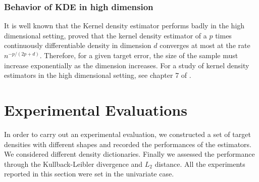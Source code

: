 \subsubsection{Behavior of KDE in high dimension}
It is well known that the Kernel density estimator performs badly in the high dimensional setting, \citep{stone1980} proved that the kernel density estimator of a $p$ times continuously differentiable density in dimension $d$ converges at most at the rate $n^{-p/(2p+d)}$. Therefore, for a given target error, the size of the sample must increase exponentially as the dimension increases. For a study of kernel density estimators in the high dimensional setting, see chapter 7 of \citep{scott_multivariate_2015}. 

\section{Experimental Evaluations}

In order to carry out an experimental evaluation, we constructed a set of target densities with different shapes and recorded the performances of the estimators. We considered different density dictionaries. Finally we assessed the performance through the Kullback-Leibler divergence and $L_2$ distance. All the experiments reported in this section were set in the univariate case.

